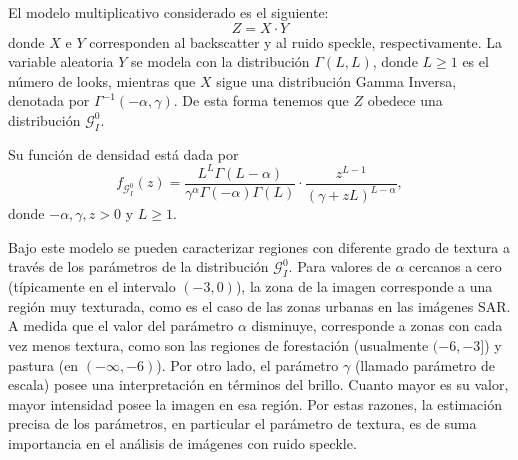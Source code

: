 \documentclass[11pt]{article}
\begin{document}
El modelo multiplicativo considerado es el siguiente:
\begin{equation*}
Z=X \cdot Y  
\end{equation*}
donde $X$ e $Y$ corresponden al backscatter y al ruido speckle, respectivamente. La variable aleatoria $Y$ se modela con la distribución $\Gamma ( L,L) $, donde $L\geq 1$ es el número de looks, mientras que $X$ sigue una distribución Gamma Inversa, denotada por  $\Gamma^{-1}(-\alpha ,\gamma) $. De esta forma tenemos que $Z$ obedece una distribución $\mathcal G_I^0$.

Su función de densidad está dada por
\begin{equation*}
f_{\mathcal{G}_I^{0}}( z) =\frac{L^{L}\Gamma ( L-\alpha
	) }{\gamma ^{\alpha }\Gamma ( -\alpha ) \Gamma (
	L) }\cdot  
\frac{z^{L-1}}{( \gamma +zL) ^{L-\alpha }},%
\label{ec_dens_gI0}
\end{equation*}
donde $-\alpha,\gamma ,z>0$ y $L\geq 1$.

Bajo este modelo se pueden caracterizar regiones con diferente grado de textura a través de los parámetros de la distribución $\mathcal{G}_I^{0}$. Para valores de $\alpha$ cercanos a cero (típicamente en el intervalo $(-3,0)$), la zona de la imagen corresponde a una región muy texturada, como es el caso de las zonas urbanas en las imágenes SAR. A medida que el valor del parámetro $\alpha$ disminuye, corresponde a zonas con cada vez menos textura, como son las regiones de forestación (usualmente $(-6,-3]$) y pastura (en $(-\infty,-6)$). Por otro lado, el parámetro $\gamma$ (llamado parámetro de escala) posee una interpretación en términos del brillo. Cuanto mayor es su valor, mayor intensidad posee la imagen en esa región. Por estas razones, la estimación precisa de los parámetros, en particular el parámetro de textura, es de suma importancia en el análisis de imágenes con ruido speckle. 

\end{document}
